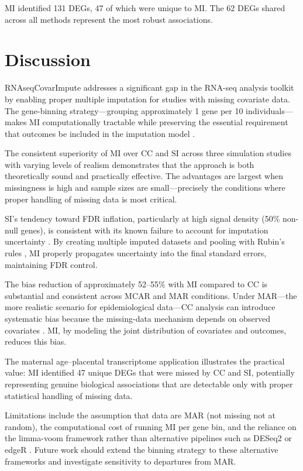 \documentclass[11pt]{article}
\begin{document}
MI identified 131 DEGs, 47 of which were unique to MI. The 62 DEGs shared across all methods represent the most robust associations.

\section{Discussion}

RNAseqCovarImpute addresses a significant gap in the RNA-seq analysis toolkit by enabling proper multiple imputation for studies with missing covariate data. The gene-binning strategy---grouping approximately 1 gene per 10 individuals---makes MI computationally tractable while preserving the essential requirement that outcomes be included in the imputation model \citep{moons2006using}.

The consistent superiority of MI over CC and SI across three simulation studies with varying levels of realism demonstrates that the approach is both theoretically sound and practically effective. The advantages are largest when missingness is high and sample sizes are small---precisely the conditions where proper handling of missing data is most critical.

SI's tendency toward FDR inflation, particularly at high signal density (50\% non-null genes), is consistent with its known failure to account for imputation uncertainty \citep{donders2006review}. By creating multiple imputed datasets and pooling with Rubin's rules \citep{rubin1987multiple}, MI properly propagates uncertainty into the final standard errors, maintaining FDR control.

The bias reduction of approximately 52--55\% with MI compared to CC is substantial and consistent across MCAR and MAR conditions. Under MAR---the more realistic scenario for epidemiological data---CC analysis can introduce systematic bias because the missing-data mechanism depends on observed covariates \citep{little2019statistical}. MI, by modeling the joint distribution of covariates and outcomes, reduces this bias.

The maternal age--placental transcriptome application illustrates the practical value: MI identified 47 unique DEGs that were missed by CC and SI, potentially representing genuine biological associations that are detectable only with proper statistical handling of missing data.

Limitations include the assumption that data are MAR (not missing not at random), the computational cost of running MI per gene bin, and the reliance on the limma-voom framework rather than alternative pipelines such as DESeq2 \citep{love2014deseq2} or edgeR \citep{robinson2010edger}. Future work should extend the binning strategy to these alternative frameworks and investigate sensitivity to departures from MAR.
\end{document}
